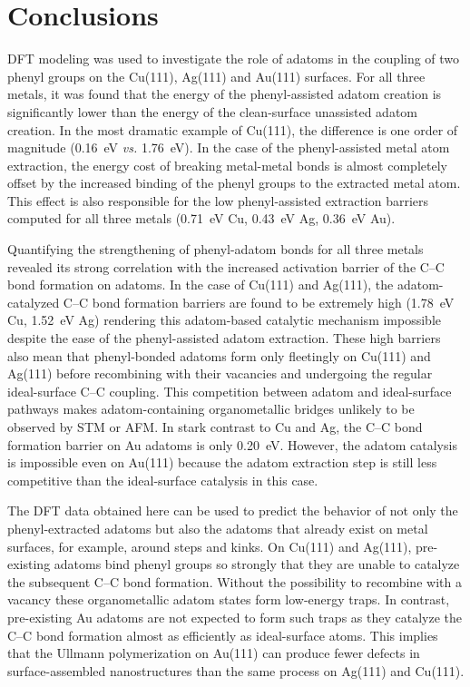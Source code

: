 \documentclass[aps,prb,amsmath,amssymb,11pt]{revtex4-1}
\begin{document}
\section*{Conclusions}

DFT modeling was used to investigate the role of adatoms in the coupling of two phenyl groups on the Cu(111), Ag(111) and Au(111) surfaces. For all three metals, it was found that the energy of the phenyl-assisted adatom creation is significantly lower than the energy of the clean-surface unassisted adatom creation. In the most dramatic example of Cu(111), the difference is one order of magnitude (\SI{0.16}{\electronvolt} \emph{vs.} \SI{1.76}{\electronvolt}). In the case of the phenyl-assisted metal atom extraction, the energy cost of breaking metal-metal bonds is almost completely offset by the increased binding of the phenyl groups to the extracted metal atom. This effect is also responsible for the low phenyl-assisted extraction barriers computed for all three metals (\SI{0.71}{\electronvolt} Cu, \SI{0.43}{\electronvolt} Ag, \SI{0.36}{\electronvolt} Au). 

Quantifying the strengthening of phenyl-adatom bonds for all three metals revealed its strong correlation with the increased activation barrier of the C--C bond formation on adatoms. In the case of Cu(111) and Ag(111), the adatom-catalyzed C--C bond formation barriers are found to be extremely high (\SI{1.78}{\electronvolt} Cu, \SI{1.52}{\electronvolt} Ag) rendering this adatom-based catalytic mechanism impossible despite the ease of the phenyl-assisted adatom extraction. These high barriers also mean that phenyl-bonded adatoms form only fleetingly on Cu(111) and Ag(111) before recombining with their vacancies and undergoing the regular ideal-surface C--C coupling. This competition between adatom and ideal-surface pathways makes adatom-containing organometallic bridges unlikely to be observed by STM or AFM. In stark contrast to Cu and Ag, the C--C bond formation barrier on Au adatoms is only \SI{0.20}{\electronvolt}. However, the adatom catalysis is impossible even on Au(111) because the adatom extraction step is still less competitive than the ideal-surface catalysis in this case.

The DFT data obtained here can be used to predict the behavior of not only the phenyl-extracted adatoms but also the adatoms that already exist on metal surfaces, for example, around steps and kinks. On Cu(111) and Ag(111), pre-existing adatoms bind phenyl groups so strongly that they are unable to catalyze the subsequent C--C bond formation. Without the possibility to recombine with a vacancy these organometallic adatom states form low-energy traps. In contrast, pre-existing Au adatoms are not expected to form such traps as they catalyze the C--C bond formation almost as efficiently as ideal-surface atoms. This implies that the Ullmann polymerization on Au(111) can produce fewer defects in surface-assembled nanostructures than the same process on Ag(111) and Cu(111).
\end{document}
